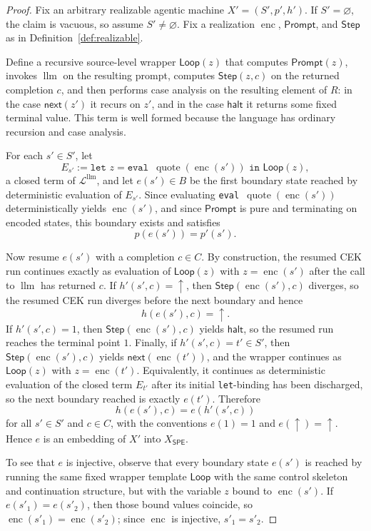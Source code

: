 \documentclass[11pt]{article}
\newcommand{\SPE}{\mathsf{SPE}}
\newcommand{\quoteop}{\operatorname{quote}}
\newcommand{\enc}{\operatorname{enc}}
\newcommand{\llm}{\operatorname{llm}}
\begin{document}
\begin{proof}
Fix an arbitrary realizable agentic machine $X'=(S',p',h')$. If $S'=\varnothing$, the claim is vacuous, so assume $S'\neq\varnothing$. Fix a realization $\enc$, $\mathsf{Prompt}$, and $\mathsf{Step}$ as in Definition~\ref{def:realizable}.

Define a recursive source-level wrapper $\mathsf{Loop}(z)$ that computes $\mathsf{Prompt}(z)$, invokes $\llm$ on the resulting prompt, computes $\mathsf{Step}(z,c)$ on the returned completion $c$, and then performs case analysis on the resulting element of $R$: in the case $\mathsf{next}(z')$ it recurs on $z'$, and in the case $\mathsf{halt}$ it returns some fixed terminal value. This term is well formed because the language has ordinary recursion and case analysis.

For each $s'\in S'$, let
\[
E_{s'}:=\texttt{let } z = \texttt{eval }\,\quoteop(\enc(s')) \texttt{ in } \mathsf{Loop}(z),
\]
a closed term of $\mathcal{L}^{\llm}$, and let $e(s')\in B$ be the first boundary state reached by deterministic evaluation of $E_{s'}$. Since evaluating \texttt{eval} $\,\quoteop(\enc(s'))$ deterministically yields $\enc(s')$, and since $\mathsf{Prompt}$ is pure and terminating on encoded states, this boundary exists and satisfies
\[
p(e(s'))=p'(s').
\]

Now resume $e(s')$ with a completion $c\in C$. By construction, the resumed CEK run continues exactly as evaluation of $\mathsf{Loop}(z)$ with $z=\enc(s')$ after the call to $\llm$ has returned $c$. If $h'(s',c)=\uparrow$, then $\mathsf{Step}(\enc(s'),c)$ diverges, so the resumed CEK run diverges before the next boundary and hence
\[
h(e(s'),c)=\uparrow.
\]
If $h'(s',c)=1$, then $\mathsf{Step}(\enc(s'),c)$ yields $\mathsf{halt}$, so the resumed run reaches the terminal point $1$. Finally, if $h'(s',c)=t'\in S'$, then $\mathsf{Step}(\enc(s'),c)$ yields $\mathsf{next}(\enc(t'))$, and the wrapper continues as $\mathsf{Loop}(z)$ with $z=\enc(t')$. Equivalently, it continues as deterministic evaluation of the closed term $E_{t'}$ after its initial \texttt{let}-binding has been discharged, so the next boundary reached is exactly $e(t')$. Therefore
\[
h(e(s'),c)=e(h'(s',c))
\]
for all $s'\in S'$ and $c\in C$, with the conventions $e(1)=1$ and $e(\uparrow)=\uparrow$. Hence $e$ is an embedding of $X'$ into $X_{\SPE}$.

To see that $e$ is injective, observe that every boundary state $e(s')$ is reached by running the same fixed wrapper template $\mathsf{Loop}$ with the same control skeleton and continuation structure, but with the variable $z$ bound to $\enc(s')$. If $e(s'_1)=e(s'_2)$, then those bound values coincide, so $\enc(s'_1)=\enc(s'_2)$; since $\enc$ is injective, $s'_1=s'_2$.


\end{proof}
\end{document}
